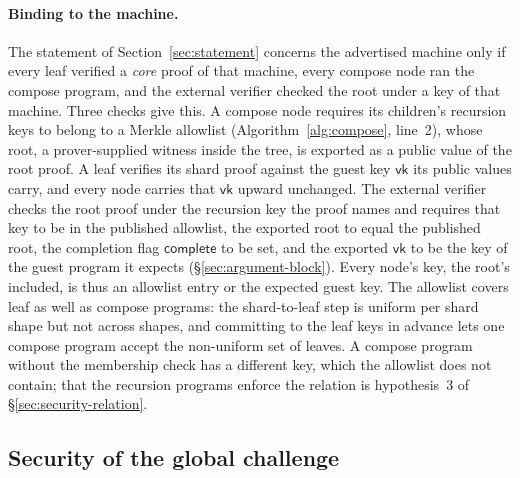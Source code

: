\paragraph{Binding to the machine.} The statement of Section~\ref{sec:statement} concerns the advertised machine only if every leaf verified a \emph{core} proof of that machine, every compose node ran the compose program, and the external verifier checked the root under a key of that machine. Three checks give this. A compose node requires its children's recursion keys to belong to a Merkle allowlist (Algorithm~\ref{alg:compose}, line~2), whose root, a prover-supplied witness inside the tree, is exported as a public value of the root proof. A leaf verifies its shard proof against the guest key $\mathsf{vk}$ its public values carry, and every node carries that $\mathsf{vk}$ upward unchanged. The external verifier checks the root proof under the recursion key the proof names and requires that key to be in the published allowlist, the exported root to equal the published root, the completion flag $\mathsf{complete}$ to be set, and the exported $\mathsf{vk}$ to be the key of the guest program it expects (\S\ref{sec:argument-block}). Every node's key, the root's included, is thus an allowlist entry or the expected guest key. The allowlist covers leaf as well as compose programs: the shard-to-leaf step is uniform per shard shape but not across shapes, and committing to the leaf keys in advance lets one compose program accept the non-uniform set of leaves. A compose program without the membership check has a different key, which the allowlist does not contain; that the recursion programs enforce the relation is hypothesis~3 of \S\ref{sec:security-relation}.

\subsection{Security of the global challenge}
\label{sec:global-security}

